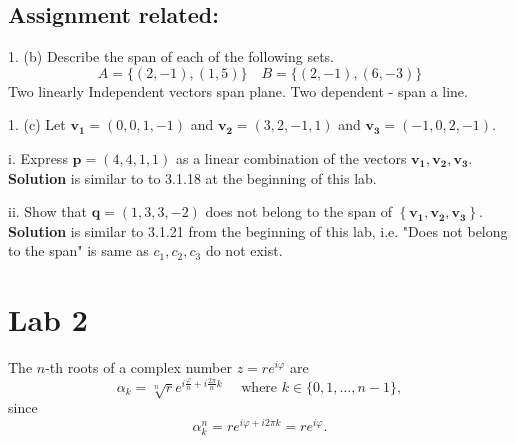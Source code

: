 \documentclass{article}
\begin{document}
\subsection{Assignment related:} 

1. (b) Describe the span of each of the following sets.
$$
A=\{(2,-1),(1,5)\} \quad B=\{(2,-1),(6,-3)\}
$$
Two linearly Independent vectors span plane. Two dependent - span a line. 

1. (c) Let $\mathbf{v}_{\mathbf{1}}=(0,0,1,-1)$ and $\mathbf{v}_{\mathbf{2}}=(3,2,-1,1)$ and $\mathbf{v}_{\mathbf{3}}=(-1,0,2,-1)$.

i. Express $\mathbf{p}=(4,4,1,1)$ as a linear combination of the vectors $\mathbf{v}_{\mathbf{1}}, \mathbf{v}_{\mathbf{2}}, \mathbf{v}_{\mathbf{3}}$. \textbf{Solution} is similar to to 3.1.18 at the beginning of this lab. 

ii. Show that $\mathbf{q}=(1,3,3,-2)$ does not belong to the span of $\left\{\mathbf{v}_{\mathbf{1}}, \mathbf{v}_{\mathbf{2}}, \mathbf{v}_{\mathbf{3}}\right\}$. \textbf{Solution} is similar to 3.1.21 from the beginning of this lab, i.e. "Does not belong to the span" is same as $c_{1},c_{2},c_{3}$ do not exist.  

\section{Lab 2}\label{sec:lab2}

The $n$-th roots of a complex number $z=r e^{i \varphi}$ are
$$
\alpha_k=\sqrt[n]{r} e^{i \frac{\varphi}{n}+i \frac{2 \pi}{n} k} \quad \text { where } k \in\{0,1, \ldots, n-1\},
$$
since
$$
\alpha_k^n=r e^{i \varphi+i 2 \pi k}=r e^{i \varphi} .
$$
\end{document}
